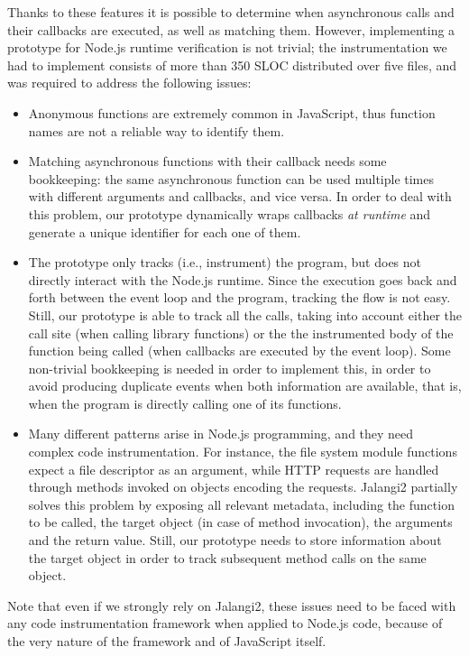Thanks to these features it is possible to determine when asynchronous calls and their callbacks are executed, as well as matching them.
However, implementing a prototype for Node.js runtime verification is not trivial; the instrumentation we had to implement
consists of more than 350 SLOC distributed over five files, and was required to address the following issues:
\begin{itemize}
\item Anonymous functions are extremely common in JavaScript, thus function names are not a reliable way to identify them.
\item Matching asynchronous functions with their callback needs some bookkeeping: the same asynchronous function can be used multiple times with different arguments and callbacks, and vice versa.
In order to deal with this problem, our prototype dynamically wraps callbacks \emph{at runtime} and generate a unique identifier for each one of them.
\item The prototype only tracks (i.e., instrument) the program, but does not directly interact with the Node.js runtime.
Since the execution goes back and forth between the event loop and the program, tracking the flow is not easy.
Still, our prototype is able to track all the calls, taking into account either the call site (when calling library functions) or the the instrumented body of the function being called (when callbacks are executed by the event loop).
Some non-trivial bookkeeping is needed in order to implement this, in order to avoid producing duplicate events when both information are available, that is, when the program is directly calling one of its functions.
\item Many different patterns arise in Node.js programming, and they need complex code instrumentation.
For instance, the file system module functions expect a file descriptor as an argument, while HTTP requests are handled through methods invoked on objects encoding the requests.
Jalangi2 partially solves this problem by exposing all relevant metadata, including the function to be called, the target object (in case of method invocation), the arguments and the return value.
Still, our prototype needs to store information about the target object in order to track subsequent method calls on the same object.
\end{itemize}
Note that even if we strongly rely on Jalangi2, these issues need to be faced with any code instrumentation framework when applied to Node.js code, because of the very nature of the framework and of JavaScript itself.


